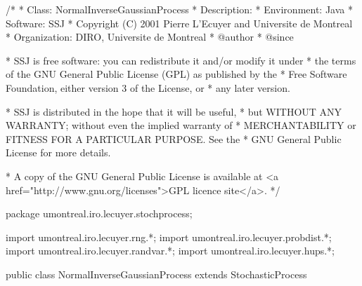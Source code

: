 \begin{code}
\begin{hide}
/*
 * Class:        NormalInverseGaussianProcess
 * Description:  
 * Environment:  Java
 * Software:     SSJ 
 * Copyright (C) 2001  Pierre L'Ecuyer and Universite de Montreal
 * Organization: DIRO, Universite de Montreal
 * @author       
 * @since

 * SSJ is free software: you can redistribute it and/or modify it under
 * the terms of the GNU General Public License (GPL) as published by the
 * Free Software Foundation, either version 3 of the License, or
 * any later version.

 * SSJ is distributed in the hope that it will be useful,
 * but WITHOUT ANY WARRANTY; without even the implied warranty of
 * MERCHANTABILITY or FITNESS FOR A PARTICULAR PURPOSE.  See the
 * GNU General Public License for more details.

 * A copy of the GNU General Public License is available at
   <a href="http://www.gnu.org/licenses">GPL licence site</a>.
 */
\end{hide}
package umontreal.iro.lecuyer.stochprocess;\begin{hide}
import umontreal.iro.lecuyer.rng.*;
import umontreal.iro.lecuyer.probdist.*;
import umontreal.iro.lecuyer.randvar.*;
import umontreal.iro.lecuyer.hups.*;

\end{hide}

public class NormalInverseGaussianProcess extends StochasticProcess \begin{hide} {
    protected RandomStream streamIG1;   // U[0,1) gen used in the inverse gaussian
    protected RandomStream streamIG2;   // U[0,1) gen used (maybe) in the inverse gaussian
    protected RandomStream streamBrownian;   // U[0,1) gen for the normal "Brownian"

    protected InverseGaussianProcess igProcess; 
    protected NormalGen normalGen;
    // Randomized time generated by the InverseGaussianProcess.
    protected double[] stochTime;
    double[] dt;
    double[] mudt;

    // Parameters of the normal inverse gaussian
    protected double mu;
    protected double delta;
    protected double alpha;
    protected double beta;
    protected double gamma;


\end{hide}
\end{code}
